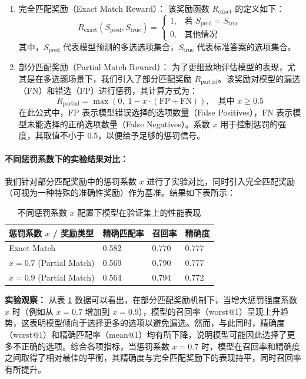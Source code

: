 \documentclass{pkuthesis}
\begin{document}
\begin{enumerate}[label=(\arabic*)]
    \item 完全匹配奖励（Exact Match Reward）：
    该奖励函数 $R_{\mathrm{exact}}$ 的定义如下：
    $$R_{\mathrm{exact}}(S_{\mathrm{pred}}, S_{\mathrm{true}}) = \begin{cases} 1, & \text{若 } S_{\mathrm{pred}} = S_{\mathrm{true}} \\ 0, & \text{其他情况} \end{cases}$$
    其中，$S_{\mathrm{pred}}$ 代表模型预测的多选选项集合，$S_{\mathrm{true}}$ 代表标准答案的选项集合。

    \item 部分匹配奖励（Partial Match Reward）：
    为了更细致地评估模型的表现，尤其是在多选题场景下，我们引入了部分匹配奖励 $R_{\mathrm{partial}}$。该奖励对模型的漏选（FN）和错选（FP）进行惩罚，其计算方式为：
    $$R_{\mathrm{partial}} = \max\left(0,\;1 - x \cdot (\mathrm{FP} + \mathrm{FN})\right),\quad \text{其中 } x \ge 0.5$$
在此公式中，FP 表示模型错误选择的选项数量（False Positives），FN 表示模型未能选择的正确选项数量（False Negatives）。系数 $x$ 用于控制惩罚的强度，其取值不小于 0.5，以便给予足够的惩罚信号。

\end{enumerate}

\paragraph{不同惩罚系数下的实验结果对比：}
我们针对部分匹配奖励中的惩罚系数 $x$ 进行了实验对比，同时引入完全匹配奖励（可视为一种特殊的准确性奖励）作为基准。结果如下表所示：

\begin{table}[h]
\centering
\caption{不同惩罚系数 $x$ 配置下模型在验证集上的性能表现}
\begin{tabular}{|l|l|l|l|}
\hline
惩罚系数 $x$ / 奖励类型 & 精确匹配率 & 召回率 & 精确度 \\
\hline
Exact Match & 0.582 & 0.770 & 0.777 \\
\hline
$x=0.7$ (Partial Match) & 0.569 & 0.790 & 0.777 \\
\hline
$x=0.9$ (Partial Match) & 0.564 & 0.794 & 0.772 \\
\hline
\end{tabular}
\label{tab:penalty_coefficient_comparison}
\end{table}

\textbf{实验观察：} 从表 \ref{tab:penalty_coefficient_comparison} 数据可以看出，在部分匹配奖励机制下，当增大惩罚强度系数 $x$ 时（例如从 $x=0.7$ 增加到 $x=0.9$），模型的召回率（worst@1）呈现上升趋势，这表明模型倾向于选择更多的选项以避免漏选。然而，与此同时，精确度（worst@1）和精确匹配率（mean@1）均有所下降，说明模型可能因此选择了更多不正确的选项。综合各项指标，当惩罚系数 $x=0.7$ 时，模型在召回率和精确度之间取得了相对最佳的平衡，其精确度与完全匹配奖励下的表现持平，同时召回率有所提升。
\end{document}
